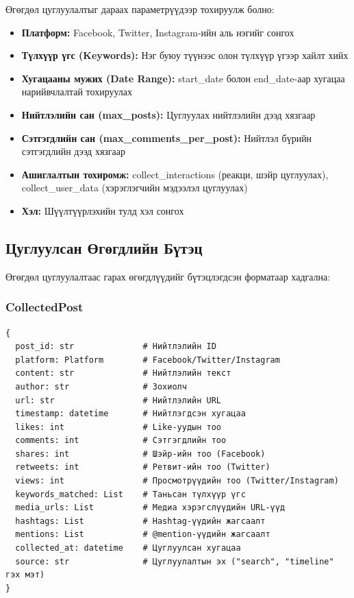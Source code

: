 \documentclass[12pt,a4paper]{report}
\begin{document}
Өгөгдөл цуглуулалтыг дараах параметрүүдээр тохируулж болно:

\begin{itemize}
    \item \textbf{Платформ:} Facebook, Twitter, Instagram-ийн аль нэгийг сонгох
    \item \textbf{Түлхүүр үгс (Keywords):} Нэг буюу түүнээс олон түлхүүр үгээр хайлт хийх
    \item \textbf{Хугацааны мужих (Date Range):} start\_date болон end\_date-аар хугацаа нарийвчлалтай тохируулах
    \item \textbf{Нийтлэлийн сан (max\_posts):} Цуглуулах нийтлэлийн дээд хязгаар
    \item \textbf{Сэтгэгдлийн сан (max\_comments\_per\_post):} Нийтлэл бүрийн сэтгэгдлийн дээд хязгаар
    \item \textbf{Ашиглалтын тохиромж:} collect\_interactions (реакци, шэйр цуглуулах), collect\_user\_data (хэрэглэгчийн мэдээлэл цуглуулах)
    \item \textbf{Хэл:} Шүүлтүүрлэхийн тулд хэл сонгох
\end{itemize}

\subsection{Цуглуулсан Өгөгдлийн Бүтэц}

Өгөгдөл цуглуулалтаас гарах өгөгдлүүдийг бүтэцлэгдсэн форматаар хадгална:

\subsubsection{CollectedPost}

\begin{verbatim}
{
  post_id: str              # Нийтлэлийн ID
  platform: Platform        # Facebook/Twitter/Instagram
  content: str              # Нийтлэлийн текст
  author: str               # Зохиолч
  url: str                  # Нийтлэлийн URL
  timestamp: datetime       # Нийтлэгдсэн хугацаа
  likes: int                # Like-уудын тоо
  comments: int             # Сэтгэгдлийн тоо
  shares: int               # Шэйр-ийн тоо (Facebook)
  retweets: int             # Ретвит-ийн тоо (Twitter)
  views: int                # Просмотрүүдийн тоо (Twitter/Instagram)
  keywords_matched: List    # Таньсан түлхүүр үгс
  media_urls: List          # Медиа хэрэгслүүдийн URL-үүд
  hashtags: List            # Hashtag-үүдийн жагсаалт
  mentions: List            # @mention-үүдийн жагсаалт
  collected_at: datetime    # Цуглуулсан хугацаа
  source: str               # Цуглуулалтын эх ("search", "timeline" гэх мэт)
}
\end{verbatim}
\end{document}
